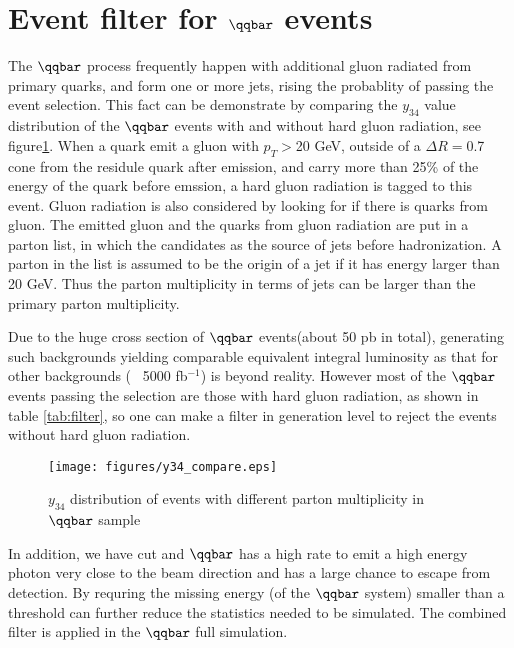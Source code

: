 \section{Event filter for $\qqbar$ events}
 The $\qqbar$ process frequently happen with additional gluon radiated from primary quarks, and form one or more jets, rising the probablity of passing the event selection. This fact can be demonstrate by comparing the $y_{34}$ value distribution of the $\qqbar$ events with and without hard gluon radiation, see figure\ref{fig:y34_filter}. When a quark emit a gluon with $p_T>$20 GeV, outside of a $\Delta R=$0.7 cone from the residule quark after emission, and carry more than 25\% of the energy of the quark before emssion, a hard gluon radiation is tagged to this event. Gluon radiation is also considered by looking for if there is quarks from gluon. The emitted gluon and the quarks from gluon radiation are put in a parton list, in which the candidates as the source of jets before hadronization. A parton in the list is assumed to be the origin of a jet if it has energy larger than 20 GeV. Thus the parton multiplicity in terms of jets can be larger than the primary parton multiplicity.\par
 
 
Due to the huge cross section of $\qqbar$ events(about 50 pb in total), generating such backgrounds yielding comparable equivalent integral luminosity as that for other backgrounds (~ 5000 fb$^{-1}$) is beyond reality. However most of the $\qqbar$ events passing the selection are those with hard gluon radiation, as shown in table \ref{tab:filter}, so one can make a filter in generation level to reject the events without hard gluon radiation. 
 

\begin{figure}[!htpb]\label{fig:fit_data}
\centering
    \texttt{[image: figures/y34\_compare.eps]}
\caption{ $y_{34}$ distribution of events with different parton multiplicity in $\qqbar$ sample}
\label{fig:y34_filter}
\end{figure}

In addition, we have \emiss cut and $\qqbar$ has a high rate to emit a high energy photon very close to the beam direction and has a large chance to escape from detection. By requring the missing energy (of the $\qqbar$ system) smaller than a threshold can further reduce the statistics needed to be simulated. The combined filter is applied in the $\qqbar$ full simulation.

